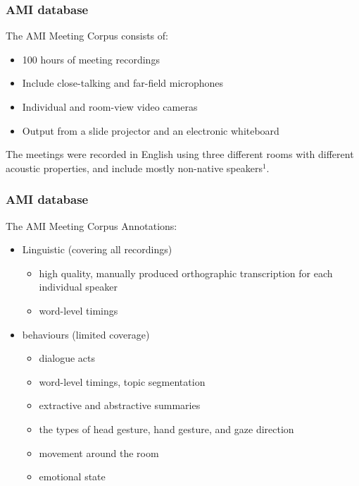 \begin{frame}

  \frametitle{AMI database}
  The AMI Meeting Corpus consists of:
  \begin{center}
    \begin{itemize}
      \item 100 hours of meeting recordings
      \item Include close-talking and far-field microphones
      \item Individual and room-view video cameras
      \item Output from a slide projector and an electronic whiteboard
    \end{itemize}
  \end{center}
The meetings were recorded in English using three different rooms with different acoustic properties, and include mostly non-native speakers$^1$.

\end{frame}


\begin{frame}

  \frametitle{AMI database}
  The AMI Meeting Corpus Annotations:
  \begin{center}
    \begin{itemize}
      \item Linguistic (covering all recordings)
        \begin{itemize}
          \item high quality, manually produced orthographic transcription for each individual speaker
          \item word-level timings
        \end{itemize}
      \item behaviours (limited coverage)
        \begin{itemize}
          \item dialogue acts
          \item word-level timings, topic segmentation
          \item extractive and abstractive summaries
          \item the types of head gesture, hand gesture, and gaze direction
          \item movement around the room
          \item emotional state
        \end{itemize}      
    \end{itemize}
  \end{center}
  
\end{frame}

